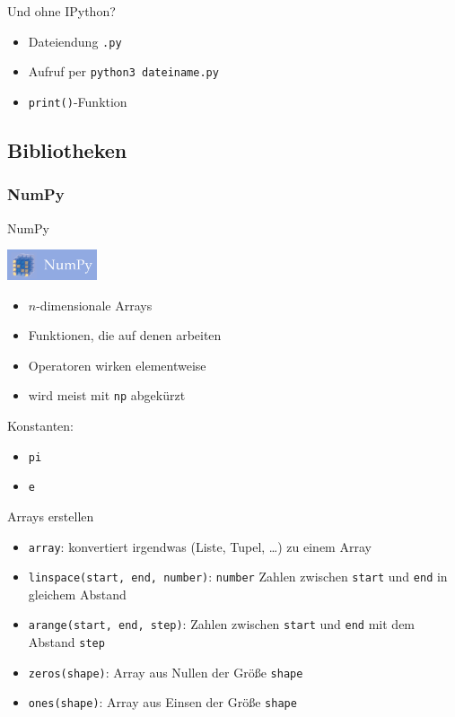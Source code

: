 \begin{frame}[fragile]{Und ohne IPython?}
  \begin{itemize}
    \item Dateiendung \texttt{.py}
    \item Aufruf per \texttt{python3 dateiname.py}
    \item \texttt{print()}-Funktion 
  \end{itemize}
\end{frame}

\subsection{Bibliotheken}
\subsubsection{NumPy}
\begin{frame}{NumPy}
  \begin{center}
    \includegraphics[width=100px]{../Notes/img/numpy.png}
  \end{center}
  \begin{itemize}
    \item $n$-dimensionale Arrays
    \item Funktionen, die auf denen arbeiten
    \item Operatoren wirken elementweise
    \item wird meist mit \texttt{np} abgekürzt
  \end{itemize}

  Konstanten:
  \begin{itemize}
    \item \texttt{pi}
    \item \texttt{e}
  \end{itemize}
\end{frame}

\begin{frame}{Arrays erstellen}
  \begin{itemize}
    \item \texttt{array}: konvertiert irgendwas (Liste, Tupel, …) zu einem Array
    \item \texttt{linspace(start, end, number)}: \texttt{number} Zahlen zwischen \texttt{start} und \texttt{end} in gleichem Abstand
    \item \texttt{arange(start, end, step)}: Zahlen zwischen \texttt{start} und \texttt{end} mit dem Abstand \texttt{step}
    \item \texttt{zeros(shape)}: Array aus Nullen der Größe \texttt{shape}
    \item \texttt{ones(shape)}: Array aus Einsen der Größe \texttt{shape}
  \end{itemize}
\end{frame}

